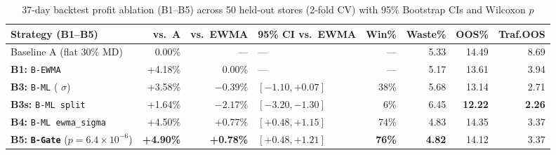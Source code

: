 \begin{table}[H]
\centering
\caption{37-day backtest profit ablation (B1--B5) across 50 held-out stores (2-fold CV) with 95\% Bootstrap CIs and Wilcoxon $p$}
\label{tab:ops_chest_backtest}
\footnotesize
\setlength{\tabcolsep}{3pt}
\begin{tabularx}{\textwidth}{Y r r L{2.35cm} r r r r}
\toprule
\textbf{Strategy (B1--B5)} & \textbf{vs.\ A} & \textbf{vs.\ EWMA} & \textbf{95\% CI vs.\ EWMA} & \textbf{Win\%} & \textbf{Waste\%} & \textbf{OOS\%} & \textbf{Traf.OOS} \\
\midrule
Baseline A (flat 30\% MD) & 0.00\% & --- & --- & --- & 5.33 & 14.49 & 8.69 \\
\textbf{B1:} \texttt{B-EWMA} & +4.18\% & 0.00\% & --- & --- & 5.17 & 13.61 & 3.94 \\
\textbf{B3:} \texttt{B-ML} ( $\sigma$) & +3.58\% & $-0.39\%$ & $[-1.10, +0.07]$ & 38\% & 5.68 & 13.14 & 2.71 \\
\textbf{B3s:} \texttt{B-ML split} & +1.64\% & $-2.17\%$ & $[-3.20, -1.30]$ & 6\% & 6.45 & \textbf{12.22} & \textbf{2.26} \\
\textbf{B4:} \texttt{B-ML ewma\_sigma} & +4.50\% & +0.77\% & $[+0.48, +1.15]$ & 74\% & 4.83 & 14.35 & 3.37 \\
\textbf{B5:} \textbf{\texttt{B-Gate}} ($p=6.4\times 10^{-6}$) & \textbf{+4.90\%} & \textbf{+0.78\%} & \textbf{$[+0.48, +1.21]$} & \textbf{76\%} & \textbf{4.82} & 14.12 & 3.37 \\
\bottomrule
\end{tabularx}
\end{table}

